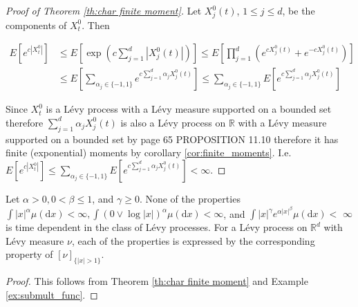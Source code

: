 \documentclass[a4paper,11pt]{article}
\begin{document}
\begin{proof}[Proof of Theorem \ref{th:char finite moment}]
    Let $X_{j}^{0}(t)$, $1 \leq j \leq d$, be the components of $X_{t}^{0}$. Then

    \begin{align}
        E\left[e^{c\left|X_{t}^{0}\right|}\right] & \leq E\left[\exp \left(c \sum_{j=1}^{d}\left|X_{j}^{0}(t)\right|\right)\right] \leq E\left[\prod_{j=1}^{d}\left(e^{c X_{j}^{0}(t)}+e^{-c X_{j}^{0}(t)}\right)\right] \\
                                                  &
        \le  E \left[ \sum_{\alpha_{j} \in \{-1,1\}} e^{c \sum_{ j=1} ^{d} \alpha_{j} X^{0}_{j}(t)} \right]
        \le  \sum_{\alpha_{j} \in \{-1,1\}} E \left[e^{c \sum_{ j=1} ^{d} \alpha_{j} X^{0}_{j}(t)} \right]
    \end{align}

    Since $X^{0}_{t}$ is a Lévy process with a Lévy measure supported on a bounded set
    therefore $\sum_{j=1}^{d} \alpha_{j} X^{0}_{j}(t)$ is also a Lévy process on $\mathbb{R}$ with a Lévy measure supported on a bounded set by \cite{sato_levy_2013} page 65 PROPOSITION 11.10
    therefore it has finite (exponential) moments by corollary \ref{cor:finite_moments}. I.e. $E\left[e^{c\left|X_{t}^{0}\right|}\right] \le \sum_{\alpha_{j} \in \{-1,1\}} E \left[e^{c \sum_{ j=1} ^{d} \alpha_{j} X^{0}_{j}(t)} \right] <  \infty$.
\end{proof}

\begin{corollary}
    Let $\alpha>0,0<\beta \leq 1$, and $\gamma \geq 0$. None of the properties
    $\int|x|^{\alpha} \mu(\mathrm{d} x)<\infty, \int(0 \vee \log |x|)^{\alpha} \mu(\mathrm{d} x)<\infty$, and
    $\int|x|^{\gamma} e^{\alpha|x|^{\beta}} \mu(\mathrm{d} x)<$ $\infty$ is time dependent in the class
    of Lévy processes. For a Lévy process on $\mathbb{R}^{d}$ with Lévy measure $\nu$, each of the properties
    is expressed by the corresponding property of $[\nu]_{\{|x|>1\}}$.
\end{corollary}

\begin{proof}
    This follows from Theorem \ref{th:char finite moment} and Example \ref{ex:submult_func}.
\end{proof}
\end{document}
